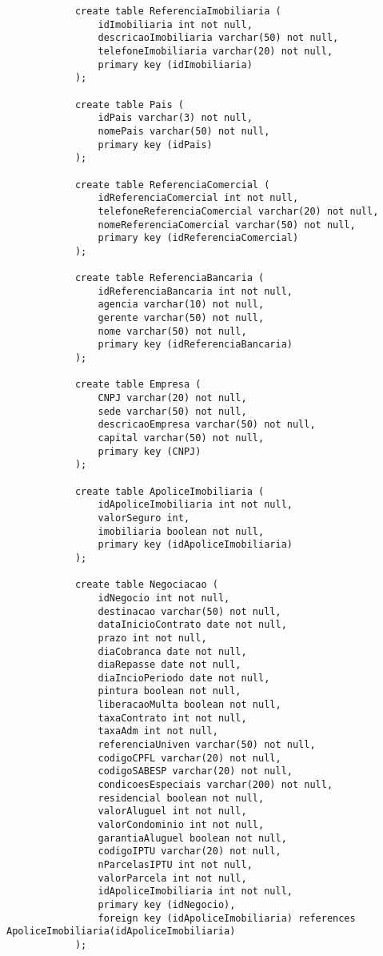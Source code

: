 \documentclass{article}
\begin{document}
\begin{lstlisting}
            create table ReferenciaImobiliaria (
            	idImobiliaria int not null,
            	descricaoImobiliaria varchar(50) not null,
            	telefoneImobiliaria varchar(20) not null,
            	primary key (idImobiliaria)
            );
            
            create table Pais (
            	idPais varchar(3) not null,
            	nomePais varchar(50) not null,
            	primary key (idPais)
            );
            
            create table ReferenciaComercial (
            	idReferenciaComercial int not null, 
            	telefoneReferenciaComercial varchar(20) not null, 
            	nomeReferenciaComercial varchar(50) not null,
            	primary key (idReferenciaComercial)
            );
            
            create table ReferenciaBancaria (
            	idReferenciaBancaria int not null,
            	agencia varchar(10) not null,
            	gerente varchar(50) not null,
            	nome varchar(50) not null,
            	primary key (idReferenciaBancaria)
            );
            
            create table Empresa (
            	CNPJ varchar(20) not null,
            	sede varchar(50) not null,
            	descricaoEmpresa varchar(50) not null,
            	capital varchar(50) not null,
            	primary key (CNPJ)
            );
            
            create table ApoliceImobiliaria (
            	idApoliceImobiliaria int not null,
            	valorSeguro int,
            	imobiliaria boolean not null,
            	primary key (idApoliceImobiliaria)
            );
            
            create table Negociacao (
            	idNegocio int not null, 
            	destinacao varchar(50) not null, 
            	dataInicioContrato date not null, 
            	prazo int not null, 
            	diaCobranca date not null, 
            	diaRepasse date not null, 
            	diaIncioPeriodo date not null, 
            	pintura boolean not null, 
            	liberacaoMulta boolean not null, 
            	taxaContrato int not null, 
            	taxaAdm int not null, 
            	referenciaUniven varchar(50) not null, 
            	codigoCPFL varchar(20) not null, 
            	codigoSABESP varchar(20) not null, 
            	condicoesEspeciais varchar(200) not null, 
            	residencial boolean not null, 
            	valorAluguel int not null, 
            	valorCondominio int not null, 
            	garantiaAluguel boolean not null, 
            	codigoIPTU varchar(20) not null, 
            	nParcelasIPTU int not null, 
            	valorParcela int not null, 
            	idApoliceImobiliaria int not null,
            	primary key (idNegocio),
            	foreign key (idApoliceImobiliaria) references ApoliceImobiliaria(idApoliceImobiliaria)
            );
            

\end{lstlisting}
\end{document}

